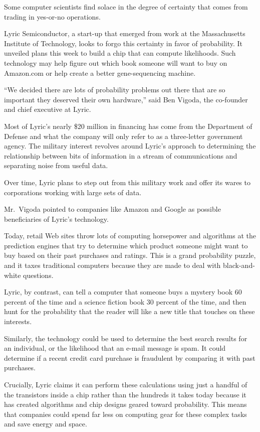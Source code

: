 ﻿\documentclass[12pt]{article}
\begin{document}
Some computer scientists find solace in the degree of certainty that comes from trading in yes-or-no
operations.

Lyric Semiconductor, a start-up that emerged from work at the Massachusetts Institute of Technology,
looks to forgo this certainty in favor of probability. It unveiled plans this week to build a chip
that can compute likelihoods. Such technology may help figure out which book someone will want to
buy on Amazon.com or help create a better gene-sequencing machine.

``We decided there are lots of probability problems out there that are so important they deserved
their own hardware,'' said Ben Vigoda, the co-founder and chief executive at Lyric.

Most of Lyric's nearly \$20 million in financing has come from the Department of Defense and what
the company will only refer to as a three-letter government agency. The military interest revolves
around Lyric's approach to determining the relationship between bits of information in a stream of
communications and separating noise from useful data.

Over time, Lyric plans to step out from this military work and offer its wares to corporations
working with large sets of data.

Mr.~Vigoda pointed to companies like Amazon and Google as possible beneficiaries of Lyric's
technology.

Today, retail Web sites throw lots of computing horsepower and algorithms at the prediction engines
that try to determine which product someone might want to buy based on their past purchases and
ratings. This is a grand probability puzzle, and it taxes traditional computers because they are
made to deal with black-and-white questions.

Lyric, by contrast, can tell a computer that someone buys a mystery book 60 percent of the time and
a science fiction book 30 percent of the time, and then hunt for the probability that the reader
will like a new title that touches on these interests.

Similarly, the technology could be used to determine the best search results for an individual, or
the likelihood that an e-mail message is spam. It could determine if a recent credit card purchase
is fraudulent by comparing it with past purchases.

Crucially, Lyric claims it can perform these calculations using just a handful of the transistors
inside a chip rather than the hundreds it takes today because it has created algorithms and chip
designs geared toward probability. This means that companies could spend far less on computing gear
for these complex tasks and save energy and space.
\end{document}

